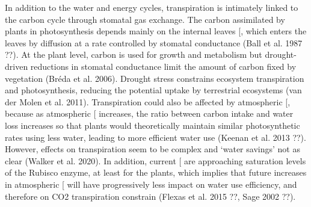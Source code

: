 \documentclass[11pt,twoside]{reedthesis}
\begin{document}
In addition to the water and energy cycles, transpiration is intimately
linked to the carbon cycle through stomatal gas exchange. The carbon
assimilated by plants in photosynthesis depends mainly on the internal
leaves {[}\text{$CO_2$}{]}, which enters the leaves by diffusion at a
rate controlled by stomatal conductance (Ball et al. 1987 ??). At the
plant level, carbon is used for growth and metabolism but drought-driven
reductions in stomatal conductance limit the amount of carbon fixed by
vegetation (Bréda et al. 2006). Drought stress constrains ecosystem
transpiration and photosynthesis, reducing the potential 
uptake by terrestrial ecosystems (van der Molen et al. 2011).
Transpiration could also be affected by atmospheric {[}\text{$CO_2$}{]},
because as atmospheric {[}\text{$CO_2$}{]} increases, the ratio between
carbon intake and water loss increases so that plants would
theoretically maintain similar photosynthetic rates using less water,
leading to more efficient water use (Keenan et al. 2013 ??). However,
 effects on transpiration seem to be complex and `water
savings' not as clear (Walker et al. 2020). In addition, current
{[}\text{$CO_2$}{]} are approaching saturation levels of the Rubisco
enzyme, at least for the  plants, which implies that future
increases in atmospheric {[}\text{$CO_2$}{]} will have progressively
less impact on water use efficiency, and therefore on CO2 transpiration
constrain (Flexas et al. 2015 ??, Sage 2002 ??).\par
\end{document}
